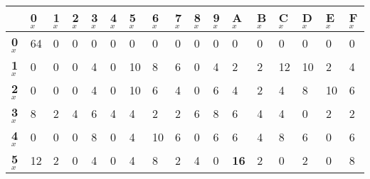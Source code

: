 \begin{longtable}[c]{|l|l|l|l|l|l|l|l|l|l|l|l|l|l|l|l|l|}
\hline
                & \textbf{0$_x$} & \textbf{1$_x$} & \textbf{2$_x$} & \textbf{3$_x$} & \textbf{4$_x$} & \textbf{5$_x$} & \textbf{6$_x$} & \textbf{7$_x$} & \textbf{8$_x$} & \textbf{9$_x$} & \textbf{A$_x$} & \textbf{B$_x$} & \textbf{C$_x$} & \textbf{D$_x$} & \textbf{E$_x$} & \textbf{F$_x$} \\ \hline
\endfirsthead
%
\endhead
%
\textbf{0$_x$}  & 64             & 0              & 0              & 0              & 0              & 0              & 0              & 0              & 0              & 0              & 0              & 0              & 0              & 0              & 0              & 0              \\ \hline
\textbf{1$_x$}  & 0              & 0              & 0              & 4              & 0              & 10             & 8              & 6              & 0              & 4              & 2              & 2              & 12             & 10             & 2              & 4              \\ \hline
\textbf{2$_x$}  & 0              & 0              & 0              & 4              & 0              & 10             & 6              & 4              & 0              & 6              & 4              & 2              & 4              & 8              & 10             & 6              \\ \hline
\textbf{3$_x$}  & 8              & 2              & 4              & 6              & 4              & 4              & 2              & 2              & 6              & 8              & 6              & 4              & 4              & 0              & 2              & 2              \\ \hline
\textbf{4$_x$}  & 0              & 0              & 0              & 8              & 0              & 4              & 10             & 6              & 0              & 6              & 6              & 4              & 8              & 6              & 0              & 6              \\ \hline
\textbf{5$_x$}  & 12             & 2              & 0              & 4              & 0              & 4              & 8              & 2              & 4              & 0              & \textbf{16}             & 2              & 0              & 2              & 0              & 8              \\ \hline

\end{longtable}
